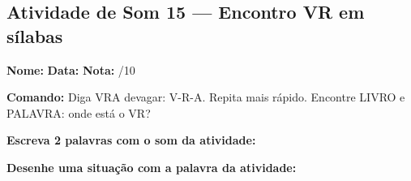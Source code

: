 \subsection{Atividade de Som 15 --- Encontro VR em sílabas}
\begin{exercicio}



\noindent\textbf{Nome:} \underline{\hspace{3.2cm}} \quad \textbf{Data:} \underline{\hspace{1.6cm}} \quad \textbf{Nota:} \underline{\hspace{0.9cm}}/10


\noindent\textbf{Comando:} Diga VRA devagar: V-R-A. Repita mais rápido. Encontre LIVRO e PALAVRA: onde está o VR?


\begin{center}
\end{center}

\noindent\textbf{Escreva 2 palavras com o som da atividade:}

\begin{center}
  \underline{\hspace{3cm}} \quad \underline{\hspace{3cm}}
\end{center}

\noindent\textbf{Desenhe uma situação com a palavra da atividade:}

\begin{center}
\end{center}

\end{exercicio}



